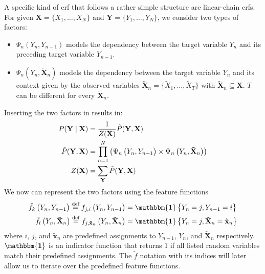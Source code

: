 A specific kind of \gls{crf} that follows a rather simple structure are \glspl{linear-chain crf}.
For given $\mathbf{X}=\{X_1,\dots,X_N\}$ and $\mathbf{Y}=\{Y_1,\dots,Y_N\}$, we consider two types of \glspl{factor}:
\begin{itemize}
  \item $\Psi_n(Y_n,Y_{n-1})$ models the dependency between the \gls{target variable} $Y_n$ and its preceding \gls{target variable} $Y_{n-1}$.
  \item $\Psi_n(Y_n,\mathbf{\tilde{X}}_n)$ models the dependency between the \gls{target variable} $Y_n$ and its context given by the \glspl{observed variable} $\mathbf{\tilde{X}}_n=\{\tilde{X}_1,\dots,\tilde{X}_T\}$ with $\mathbf{\tilde{X}}_n\subseteq\mathbf{X}$.
    $T$ can be different for every $\mathbf{\tilde{X}}_n$.
\end{itemize}
Inserting the two factors in  results in:
\begin{equation}
  \label{equ:linear-chain-crf-factor}
  \begin{split}
    P(\mathbf{Y}\mid\mathbf{X}) & = \frac{1}{Z(\mathbf{X})}\tilde{P}(\mathbf{Y},\mathbf{X}) \\
    \tilde{P}(\mathbf{Y},\mathbf{X}) &= \prod_{n=1}^{N}\left(\Psi_n\left(\vphantom{\tilde{X}}Y_n,Y_{n-1}\right)\times\Psi_n\left(Y_n,\mathbf{\tilde{X}}_n\right)\right) \\
    Z(\mathbf{X}) & = \sum_{\mathbf{Y}}\tilde{P}(\mathbf{Y},\mathbf{X})
  \end{split}
\end{equation}
We now can represent the two \glspl{factor} using the \glspl{feature function}
\begin{equation}
  \label{equ:linear-chain-crf-feature-functions}
  \begin{split}
    \tilde{f}_k\left(\vphantom{\tilde{X}}Y_n,Y_{n-1}\right)\equalsdef f_{j,i}\left(\vphantom{\tilde{X}}Y_n,Y_{n-1}\right) & = \mathbf{\mathbbm{1}}\left\{\vphantom{\tilde{X}}Y_n=j,Y_{n-1}=i\right\}\\
    \tilde{f}_l\left(Y_n,\mathbf{\tilde{X}}_n\right)\equalsdef f_{j,\mathbf{\tilde{x}}_n}\left( Y_n,\mathbf{\tilde{X}}_n\right) & = \mathbf{\mathbbm{1}}\left\{Y_n=j,\mathbf{\tilde{X}}_n=\mathbf{\tilde{x}}_n\right\}
  \end{split}
\end{equation}
where $i$, $j$, and $\mathbf{\tilde{x}}_n$ are predefined assignments to $Y_{n-1}$, $Y_n$, and $\mathbf{\tilde{X}}_n$ respectively. $\mathbf{\mathbbm{1}}$ is an indicator function that returns $1$ if all listed \glspl{random variable} match their predefined assignments.
The $\tilde{f}$ notation with its indices will later allow us to iterate over the predefined \glspl{feature function}.

